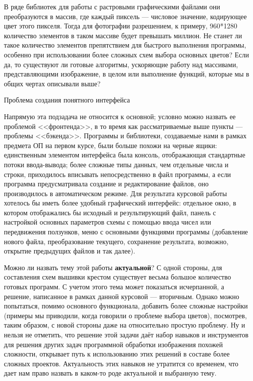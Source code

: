 \documentclass[12pt]{article}
\begin{document}
{	В ряде библиотек для работы с растровыми графическими файлами они преобразуются в массив, где каждый пиксель — числовое значение, кодирующее цвет этого пикселя. Тогда для фотографии разрешением, к примеру, 960*1280 количество элементов в таком массиве будет превышать миллион. Не станет ли такое количество элементов препятствием для быстрого выполнения программы, особенно при использовании более сложных схем выбора основных цветов? Если да, то существуют ли готовые алгоритмы, ускоряющие работу над массивами, представляющими изображение, в целом или выполнение функций, которые мы в общих чертах описывали выше?
	
	\checkmark Проблема создания понятного интерфейса

	Напрямую эта подзадача не относится к основной; условно можно назвать ее проблемой <<фронтенда>>, в то время как рассматриваемые выше пункты — проблемы <<бэкенда>>. Программы и библиотеки, создаваемые нами в рамках предмета ОП на первом курсе, были больше похожи на черные ящики: единственным элементом интерфейса была консоль, отображающая стандартные потоки ввода-вывода; более сложные типы данных, чем отдельные числа и строки, приходилось вписывать непосредственно в файл программы, а если программа предусматривала создание и редактирование файлов, оно производилось в автоматическом режиме. Для результата курсовой работы хотелось бы иметь более удобный графический интерфейс: отдельное окно, в котором отображались бы исходный и результирующий файл, панель с настройкой основных параметров схемы с помощью ввода чисел или передвижения ползунков, меню с основными функциями программы (добавление нового файла, преобразование текущего, сохранение результата, возможно, открытие предыдущих файлов и так далее).
	
	Можно ли назвать тему этой работы {\bf актуальной}? С одной стороны, для составления схем вышивки крестом существует весьма большое количество готовых программ. С учетом этого тема может показаться исчерпанной, а решение, написанное в рамках данной курсовой — вторичным. Однако можно попытаться, помимо основного функционала, добавить более сложные настройки (примеры мы приводили, когда говорили о проблеме выбора цветов), посмотрев, таким образом, с новой стороны даже на относительно простую проблему. Ну и нельзя не отметить, что решение этой задачи даёт набор навыков и инструментов для решения других задач программной обработки изображения похожей сложности, открывает путь к использованию этих решений в составе более сложных проектов. Актуальность этих навыков не утратится со временем, что дает нам право назвать в каком-то роде актуальной и выбранную тему.
	
}
\end{document}
